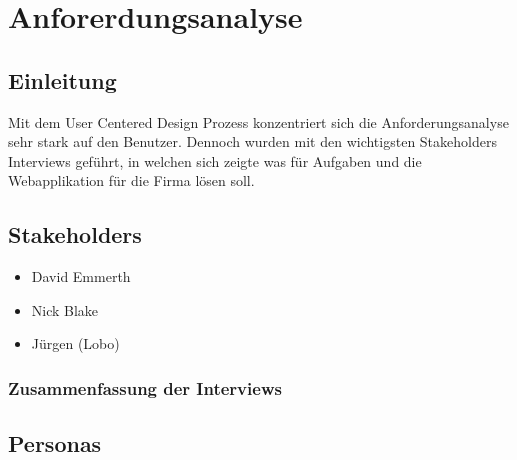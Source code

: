 \chapter{Anforerdungsanalyse}
\label{sec:anforderungsanalyse}


\section{Einleitung}
Mit dem User Centered Design Prozess konzentriert sich die Anforderungsanalyse sehr stark auf den Benutzer. Dennoch wurden mit den wichtigsten Stakeholders Interviews geführt, in welchen sich zeigte was für Aufgaben und die Webapplikation für die Firma lösen soll.




\section{Stakeholders}
\begin{itemize}
	\item David Emmerth
	\item Nick Blake
	\item Jürgen (Lobo)
\end{itemize}

\subsection{Zusammenfassung der Interviews}

\section{Personas}

